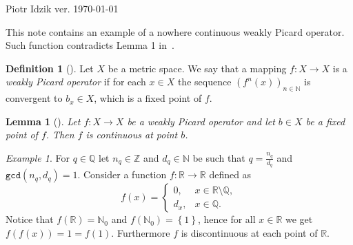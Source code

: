 \documentclass[12pt]{article}
\newcommand{\R}{\mathbb{R}}
\newcommand{\Q}{\mathbb{Q}}
\newcommand{\Z}{\mathbb{Z}}
\newcommand{\N}{\mathbb{N}}
\newcommand{\define}[1]{\textit{#1}}
\newcommand{\paren}[1]{\! \left(#1 \right)}
\newcommand{\set}[1]{\! \left\{#1 \right\}}
\renewcommand{\gcd}{\mathtt{gcd}}
\theoremstyle{plain}
\newtheorem{lemma}[theorem]{Lemma}
\theoremstyle{definition}
\newtheorem{definition}[theorem]{Definition}
\theoremstyle{remark}
\newtheorem{example}[theorem]{Example}
\begin{document}
\noindent Piotr Idzik \hfill ver. \today\ \currenttime{}

\vspace*{1cm}
This note contains an example of a nowhere continuous weakly Picard operator.
Such function contradicts Lemma 1 in~\cite{VasileBerinde2011}.

\begin{definition}[{{\cite[Definition 2]{VasileBerinde2011}}}]
    Let $X$ be a metric space.
    We say that a mapping $f \colon X \to X$ is a \define{weakly Picard operator} if
    for each $x \in X$ the sequence $\paren{f^n\paren{x}}_{n \in \N}$
    is convergent to $b_x \in X$, which is a fixed point of $f$.
\end{definition}

\begin{lemma}[{{\cite[Lemma 1]{VasileBerinde2011}}}]
    Let $f \colon X \to X$ be a weakly Picard operator and let $b \in X$ be a fixed point of $f$.
    Then $f$ is continuous at point $b$. 
\end{lemma}

\begin{example}
    For $q \in \Q$ let $n_q \in \Z$ and $d_q \in \N$ be such that $q = \frac{n_q}{d_q}$ and $\gcd\paren{n_q, d_q} = 1$.
    Consider a function $f \colon \R \to \R$ defined as
    \begin{equation*}
        f(x) = \left\{ \begin{array}{ll}
            0, & x \in \R \setminus \Q,\\
            d_x, & x \in \Q.
               \end{array} \right.
    \end{equation*} 
    Notice that $f(\R) = \N_0$ and $f(\N_0) = \set{1}$, hence for all $x \in \R$ we get $f\paren{f\paren{x}} = 1 = f\paren{1}$.
    Furthermore $f$ is discontinuous at each point of $\R$.       
\end{example}

{}

\end{document}
